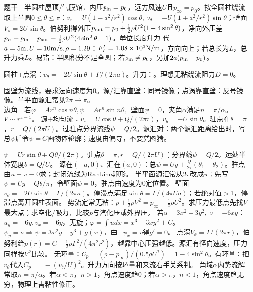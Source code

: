 题干：半圆柱屋顶/气膜馆，内压$p_{\rm in}=p_0$，远方风速$U$且$p_\infty=p_0$。按全圆柱绕流取上半圆$0\le\theta\le\pi$：$v_r=U(1-a^2/r^2)\cos\theta,\ v_\theta=-U(1+a^2/r^2)\sin\theta$；壁面$V_s=2U\sin\theta$。伯努利得外压$p_{\rm out}=p_0+\frac12\rho U^2(1-4\sin^2\theta)$，净向外压差$p_n=p_{\rm in}-p_{\rm out}=\frac12\rho U^2(4\sin^2\theta-1)$。单位长度升力
代$a=5{\rm m},U=10{\rm m/s},\rho=1.29$：$F_L'=1.08\times10^3{\rm N/m}$，方向向上；若总长为$L$，总升力乘$L$。易错：半圆积分不是全圆；若$p_{\rm in}\ne p_0$，另加$2a(p_{\rm in}-p_0)$。

圆柱+点涡：$v_\theta=-2U\sin\theta+\Gamma/(2\pi a)$。升力：。理想无粘绕流阻力$D=0$。

固壁为流线，要求法向速度为0。源/汇靠直壁：同号镜像；点涡靠直壁：反号镜像。半平面源汇常见$2\pi\to\pi$。\\
边角：若$\varphi=Ar^n\cos n\theta,\psi=Ar^n\sin n\theta$，壁面$\psi=0$，夹角$\alpha$满足$n=\pi/\alpha$。$V\sim r^{n-1}$。
源+均匀流：$v_r=U\cos\theta+Q/(2\pi r)$，$v_\theta=-U\sin\theta$。驻点在$\theta=\pi$，$r=Q/(2\pi U)$。过驻点分界流线$\psi=Q/2$。源汇对：两个源汇距离给出时，写总$\psi$后令$\psi=C$画物体轮廓；速度由偏导，不要凭图猜。

$\psi=Ur\sin\theta+Q\theta/(2\pi)$。驻点$\theta=\pi,r=Q/(2\pi U)$；分界线$\psi=Q/2$。远处半体宽度$b=Q/U$。
源在$(-a,0)$、汇在$(a,0)$：总$\psi=Uy+\frac{Q}{2\pi}(\theta_1-\theta_2)$。驻点由$u=v=0$求；封闭流线为Rankine卵形。
半平面源汇常从$2\pi$改成$\pi$；先写$\psi=Uy-Q\theta/\pi$，令壁面$\psi=0$，驻点由速度为0定位置。
壁面$v_\theta=-2U\sin\theta+\Gamma/(2\pi a)$。停滞点满足$\sin\theta=\Gamma/(4\pi Ua)$；若绝对值$>1$，停滞点离开圆柱表面。
势流定常无粘：$p+\frac12\rho V^2=p_\infty+\frac12\rho U^2$。求压力最低点先找$V$最大点；求空化/吸力，比较$p$与汽化压或外界压。
若$u=3x^2-3y^2,\;v=-6xy$：$u_y=-6y,v_x=-6y$，无旋；$\varphi=\int u dx=x^3-3xy^2+C$。$\psi_y=u\Rightarrow \psi=3x^2y-y^3+g(x)$，由$-\psi_x=v$得$g'=0$。
点涡$V_\theta=\Gamma/(2\pi r)$，伯努利给$p(r)=C-\frac12\rho\Gamma^2/(4\pi^2r^2)$，越靠中心压强越低。源汇有径向速度，压力同样按$V^2$比较。
无环量：$C_p=(p-p_\infty)/(0.5\rho U^2)=1-4\sin^2\theta$。有环量：把$v_\theta$代入$C_p=1-(v_\theta/U)^2$。升力方向按环量和来流右手关系判。
角域$\alpha$内势流解常取$n=\pi/\alpha$。若$\alpha<\pi$，$n>1$，角点速度趋0；若$\alpha>\pi$，$n<1$，角点速度趋无穷，物理上需粘性修正。

